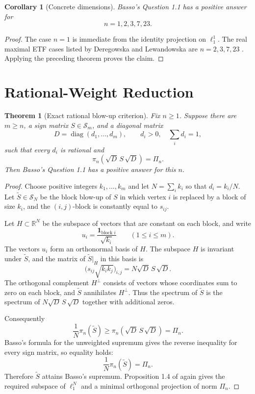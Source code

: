 \documentclass[11pt]{article}
\newtheorem{theorem}{Theorem}
\newtheorem{corollary}{Corollary}
\newcommand{\R}{\mathbb R}
\begin{document}
\begin{corollary}[Concrete dimensions]
Basso's Question 1.1 has a positive answer for
\[
  n=1,2,3,7,23.
\]
\end{corollary}

\begin{proof}
The case $n=1$ is immediate from the identity projection on $\ell_1^1$.  The
real maximal ETF cases listed by Deregowska and Lewandowska are
$n=2,3,7,23$ \cite[after Theorem 2.5]{DeregowskaLewandowska2206}.  Applying
the preceding theorem proves the claim.
\end{proof}

\section*{Rational-Weight Reduction}

\begin{theorem}[Exact rational blow-up criterion]
Fix $n\geq1$.  Suppose there are $m\geq n$, a sign matrix
$S\in\mathcal S_m$, and a diagonal matrix
\[
  D=\operatorname{diag}(d_1,\ldots,d_m),\qquad d_i>0,\quad \sum_i d_i=1,
\]
such that every $d_i$ is rational and
\[
  \pi_n(\sqrt D\,S\,\sqrt D)=\Pi_n.
\]
Then Basso's Question 1.1 has a positive answer for this $n$.
\end{theorem}

\begin{proof}
Choose positive integers $k_1,\ldots,k_m$ and let $N=\sum_i k_i$ so that
$d_i=k_i/N$.  Let $\widetilde S\in\mathcal S_N$ be the block blow-up of $S$
in which vertex $i$ is replaced by a block of size $k_i$, and the
$(i,j)$-block is constantly equal to $s_{ij}$.

Let $H\subset\R^N$ be the subspace of vectors that are constant on each block,
and write
\[
  u_i=\frac{{\mathbf 1}_{\text{block }i}}{\sqrt{k_i}}\qquad(1\leq i\leq m).
\]
The vectors $u_i$ form an orthonormal basis of $H$.  The subspace $H$ is
invariant under $\widetilde S$, and the matrix of $\widetilde S|_H$ in this
basis is
\[
  \bigl(s_{ij}\sqrt{k_ik_j}\bigr)_{i,j}
  =N\sqrt D\,S\,\sqrt D.
\]
The orthogonal complement $H^\perp$ consists of vectors whose coordinates sum
to zero on each block, and $\widetilde S$ annihilates $H^\perp$.  Thus the
spectrum of $\widetilde S$ is the spectrum of
$N\sqrt D\,S\,\sqrt D$ together with additional zeros.

Consequently
\[
  \frac{1}{N}\pi_n(\widetilde S)
  \geq \pi_n(\sqrt D\,S\,\sqrt D)
  =\Pi_n.
\]
Basso's formula for the unweighted supremum gives the reverse inequality for
every sign matrix, so equality holds:
\[
  \frac{1}{N}\pi_n(\widetilde S)=\Pi_n.
\]
Therefore $\widetilde S$ attains Basso's supremum.  Proposition 1.4 of
\cite{Basso2001} again gives the required subspace of $\ell_1^N$ and a
minimal orthogonal projection of norm $\Pi_n$.
\end{proof}
\end{document}
